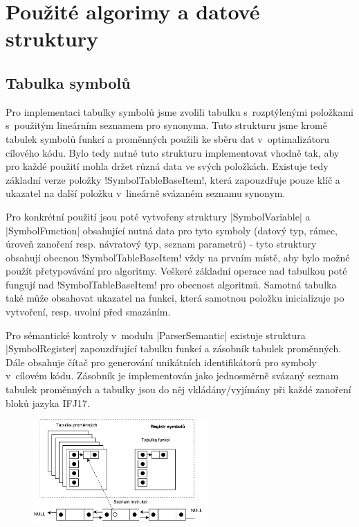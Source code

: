 \section{Použité algorimy a datové struktury}

\subsection{Tabulka symbolů}
Pro implementaci tabulky symbolů jsme zvolili tabulku s~rozptýlenými položkami s~použitým lineárním seznamem pro synonyma.
Tuto strukturu jsme kromě tabulek symbolů funkcí a proměnných použili ke sběru dat v~optimalizátoru cílového kódu. Bylo tedy nutné tuto strukturu implementovat vhodně tak, aby pro každé použití mohla držet různá data ve svých položkách. Existuje tedy základní verze položky \ic!SymbolTableBaseItem!, která zapouzdřuje pouze klíč a ukazatel na další položku v~lineárně svázaném seznamu synonym.

Pro konkrétní použití jsou poté vytvořeny struktury \ic|SymbolVariable| a \ic|SymbolFunction| obsahující nutná data pro tyto symboly (datový typ, rámec, úroveň zanoření resp. návratový typ, seznam parametrů) - tyto struktury obsahují obecnou \ic!SymbolTableBaseItem! vždy na prvním místě, aby bylo možné použít přetypovávání pro algoritmy. Veškeré základní operace nad tabulkou poté fungují nad \ic!SymbolTableBaseItem! pro obecnost algoritmů. Samotná tabulka také může obsahovat ukazatel na funkci, která samotnou položku inicializuje po vytvoření, resp. uvolní před smazáním.

Pro sémantické kontroly v~modulu \ic|ParserSemantic| existuje struktura \ic|SymbolRegister| zapouzdřující tabulku funkcí a zásobník tabulek proměnných. Dále obsahuje čítač pro generování unikátních identifikátorů pro symboly v~cílovém kódu. Zásobník je implementován jako jednosměrně svázaný seznam tabulek proměnných a tabulky jsou do něj vkládány/vyjímány při každé zanoření bloků jazyka IFJ17.

\begin{figure}[htbp]
    \centering
	\vspace*{-10pt}
    \includegraphics[width=0.6\textwidth, angle=0]{src/assets/symbol_table.pdf}
	\vspace*{-10pt}
\end{figure}

